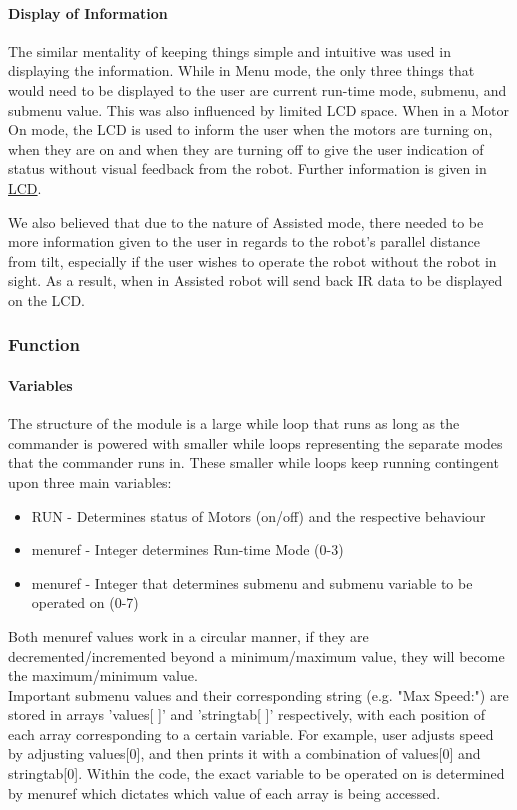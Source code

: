 \documentclass{article}
\begin{document}
	\paragraph{Display of Information}
	The similar mentality of keeping things simple and intuitive was used in displaying the information. While in Menu mode, the only three things that would need to be displayed to the user are current run-time mode, submenu, and submenu value. This was also influenced by limited LCD space. When in a Motor On mode, the LCD is used to inform the user when the motors are turning on, when they are on and when they are turning off to give the user indication of status without visual feedback from the robot. Further information is given in \underline{LCD}.
	
	We also believed that due to the nature of Assisted mode, there needed to be more information given to the user in regards to the robot's parallel distance from tilt, especially if the user wishes to operate the robot without the robot in sight. As a result, when in Assisted robot will send back IR data to be displayed on the LCD.
	
	\subsubsection{Function}
	\paragraph{Variables} The structure of the module is a large while loop that runs as long as the commander is powered with smaller while loops representing the separate modes that the commander runs in. These smaller while loops keep running contingent upon three main variables:
	\begin{itemize}
		\item RUN - Determines status of Motors (on/off) and the respective behaviour
		\item menu\textunderscore ref - Integer determines Run-time Mode (0-3)
		\item menu\textunderscore ref - Integer that determines submenu and submenu variable to be operated on (0-7)
	\end{itemize}
	
	Both menu\textunderscore ref values work in a circular manner, if they are decremented/incremented beyond a minimum/maximum value, they will become the maximum/minimum value.\\
	Important submenu values and their corresponding string (e.g. "Max Speed:") are stored in arrays 'values[ ]' and 'stringtab[ ]' respectively, with each position of each array corresponding to a certain variable. For example, user adjusts speed by adjusting values[0], and then prints it with a combination of values[0] and stringtab[0]. Within the code, the exact variable to be operated on is determined by menu\textunderscore ref which dictates which value of each array is being accessed.\\
	
\end{document}
